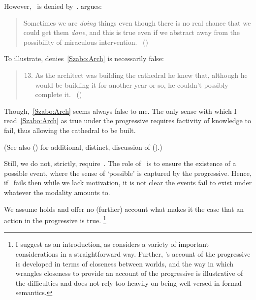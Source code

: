 \begin{note}
{    However,~ is denied by~\textcite{Szabo:2004ul}.
    \citeauthor{Szabo:2004ul} argues:
    \begin{quote}
      Sometimes we are \emph{doing} things even though there is no real chance that we could get them \emph{done}, and this is true even if we abstract away from the possibility of miraculous intervention.%
      \mbox{ }\hfill\mbox{(\citeyear[40]{Szabo:2004ul})}
    \end{quote}
    To illustrate, \citeauthor{Szabo:2004ul} denies~\ref{Szabo:Arch} is necessarily false:
    \begin{quote}
      \begin{enumerate}[label=(\arabic*), ref=(\arabic*)]
        \setcounter{enumi}{12}
      \item
        \label{Szabo:Arch}
        As the architect was building the cathedral he knew that, although he would be building it for another year or so, he couldn't possibly complete it.%
        \mbox{ }\hfill\mbox{(\citeyear[38]{Szabo:2004ul})}
      \end{enumerate}
    \end{quote}
    Though,~\ref{Szabo:Arch} seems always false to me.
    The only sense with which I read~\ref{Szabo:Arch} as true under the progressive requires factivity of knowledge to fail, thus allowing the cathedral to be built.

    (See also (\cite[1245]{Portner:2011vi}) for additional, distinct, discussion of (\cite{Szabo:2004ul}).)

    Still, we do not, strictly, require~.
    The role of~ is to ensure the existence of a possible event, where the sense of `possible' is captured by the progressive.
    Hence, if~ fails then while we lack motivation, it is not clear the events fail to exist under whatever the modality amounts to.
  }
  We assume \assuPP{} holds and offer no (further) account what makes it the case that an action in the progressive is true.%
  \footnote{
    \nocite{Portner:1998um}
    \nocite{Engelberg:1999vi}
    I suggest \textcite{Landman:1992wh} as an introduction, as \citeauthor{Landman:1992wh} considers a variety of important considerations in a straightforward way.
    Further, \citeauthor{Landman:1992wh}'s account of the progressive is developed in terms of closeness between worlds, and the way in which \citeauthor{Landman:1992wh} wrangles closeness to provide an account of the progressive is illustrative of the difficulties and does not rely too heavily on being well versed in formal semantics.

}
\end{note}
